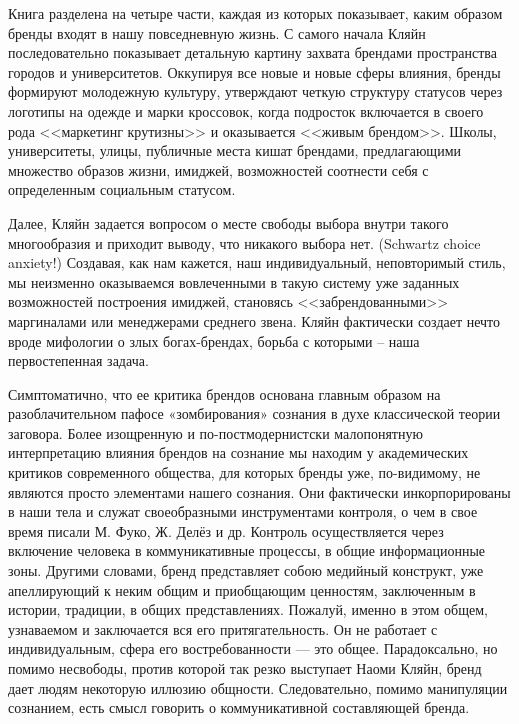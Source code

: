 Книга разделена на четыре части, каждая из которых показывает, каким образом бренды входят в нашу
повседневную жизнь. С самого начала Кляйн последовательно показывает детальную картину захвата
брендами пространства городов и университетов. Оккупируя все новые и новые сферы влияния, бренды
формируют молодежную культуру, утверждают четкую структуру статусов через логотипы на одежде и марки
кроссовок, когда подросток включается в своего рода <<маркетинг крутизны>> и оказывается <<живым
брендом>>. Школы, университеты, улицы, публичные места кишат брендами, предлагающими множество
образов жизни, имиджей, возможностей соотнести себя с определенным социальным статусом.

Далее, Кляйн задается вопросом о месте свободы выбора внутри такого многообразия и приходит выводу,
что никакого выбора нет. (Schwartz choice anxiety!) Создавая, как нам кажется, наш индивидуальный,
неповторимый стиль, мы неизменно оказываемся вовлеченными в такую систему уже заданных возможностей
построения имиджей, становясь <<забрендованными>> маргиналами или менеджерами среднего звена. Кляйн
фактически создает нечто вроде мифологии о злых богах-брендах, борьба с которыми -- наша
первостепенная задача.

Симптоматично, что ее критика брендов основана главным образом на разоблачительном пафосе
«зомбирования» сознания в духе классической теории заговора.\autocite{entin2000} Более изощренную и
по\hyp{}постмодернистски малопонятную интерпретацию влияния брендов на сознание мы находим у
академических критиков современного общества, для которых бренды уже, по-видимому, не являются
просто элементами нашего сознания.  Они фактически инкорпорированы в наши тела и служат
своеобразными инструментами контроля, о чем в свое время писали М. Фуко, Ж. Делёз и др. Контроль
осуществляется через включение человека в коммуникативные процессы, в общие информационные
зоны. Другими словами, бренд представляет собою медийный конструкт, уже апеллирующий к неким общим и
приобщающим ценностям, заключенным в истории, традиции, в общих представлениях. Пожалуй, именно в
этом общем, узнаваемом и заключается вся его притягательность. Он не работает с индивидуальным,
сфера его востребованности — это общее. Парадоксально, но помимо несвободы, против которой так резко
выступает Наоми Кляйн, бренд дает людям некоторую иллюзию общности. Следовательно, помимо
манипуляции сознанием, есть смысл говорить о коммуникативной составляющей бренда.

